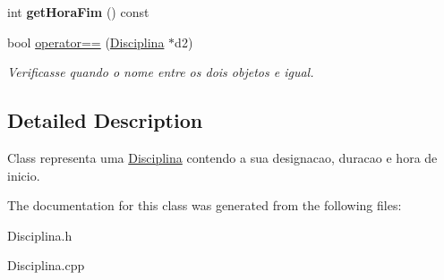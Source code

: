 \begin{DoxyCompactItemize}
\item 
\hypertarget{class_disciplina_a28b929f7e36d902da32b0ecc329420b6}{int {\bfseries get\-Hora\-Fim} () const }\label{class_disciplina_a28b929f7e36d902da32b0ecc329420b6}

\item 
\hypertarget{class_disciplina_a41f649eceb91b6e2cae441a5888c7b84}{bool \hyperlink{class_disciplina_a41f649eceb91b6e2cae441a5888c7b84}{operator==} (\hyperlink{class_disciplina}{Disciplina} $\ast$d2)}\label{class_disciplina_a41f649eceb91b6e2cae441a5888c7b84}

\begin{DoxyCompactList}\small\item\em Verificasse quando o nome entre os dois objetos e igual. \end{DoxyCompactList}\end{DoxyCompactItemize}


\subsection{Detailed Description}
Class representa uma \hyperlink{class_disciplina}{Disciplina} contendo a sua designacao, duracao e hora de inicio. 

The documentation for this class was generated from the following files\-:\begin{DoxyCompactItemize}
\item 
Disciplina.\-h\item 
Disciplina.\-cpp\end{DoxyCompactItemize}
